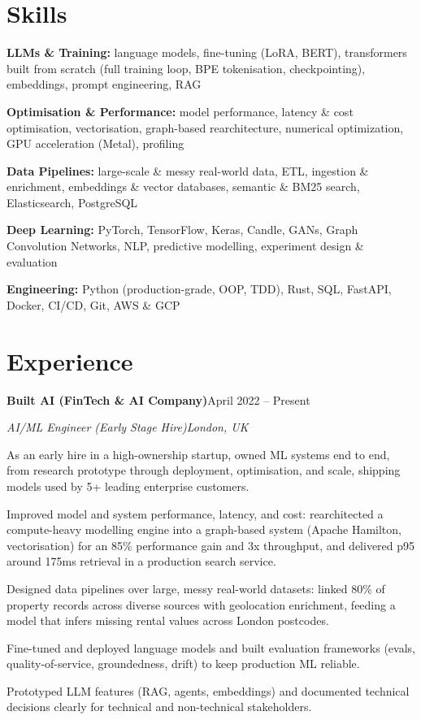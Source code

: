 \documentclass[10pt,a4paper]{article}
\newcommand{\entry}[4]{%
  {\color{company}\bfseries #1}\hfill {\color{muted}#2}\par
  \vspace{1pt}
  {\itshape #3}\hfill {\color{muted}\itshape #4}\par
  \vspace{3pt}%
}
\begin{document}
\section{Skills}
\begin{tight}
  \item[\textcolor{accent}{\small$\bullet$}] \textbf{LLMs \& Training:} language models, fine-tuning (LoRA, BERT), transformers built from scratch (full training loop, BPE tokenisation, checkpointing), embeddings, prompt engineering, RAG
  \item[\textcolor{accent}{\small$\bullet$}] \textbf{Optimisation \& Performance:} model performance, latency \& cost optimisation, vectorisation, graph-based rearchitecture, numerical optimization, GPU acceleration (Metal), profiling
  \item[\textcolor{accent}{\small$\bullet$}] \textbf{Data Pipelines:} large-scale \& messy real-world data, ETL, ingestion \& enrichment, embeddings \& vector databases, semantic \& BM25 search, Elasticsearch, PostgreSQL
  \item[\textcolor{accent}{\small$\bullet$}] \textbf{Deep Learning:} PyTorch, TensorFlow, Keras, Candle, GANs, Graph Convolution Networks, NLP, predictive modelling, experiment design \& evaluation
  \item[\textcolor{accent}{\small$\bullet$}] \textbf{Engineering:} Python (production-grade, OOP, TDD), Rust, SQL, FastAPI, Docker, CI/CD, Git, AWS \& GCP
\end{tight}

\section{Experience}
\entry{Built AI (FinTech \& AI Company)}{April 2022 -- Present}{AI/ML Engineer (Early Stage Hire)}{London, UK}
\begin{tight}
  \item As an early hire in a high-ownership startup, owned ML systems end to end, from research prototype through deployment, optimisation, and scale, shipping models used by 5+ leading enterprise customers.
  \item Improved model and system performance, latency, and cost: rearchitected a compute-heavy modelling engine into a graph-based system (Apache Hamilton, vectorisation) for an 85\% performance gain and 3x throughput, and delivered p95 around 175ms retrieval in a production search service.
  \item Designed data pipelines over large, messy real-world datasets: linked 80\% of property records across diverse sources with geolocation enrichment, feeding a model that infers missing rental values across London postcodes.
  \item Fine-tuned and deployed language models and built evaluation frameworks (evals, quality-of-service, groundedness, drift) to keep production ML reliable.
  \item Prototyped LLM features (RAG, agents, embeddings) and documented technical decisions clearly for technical and non-technical stakeholders.
\end{tight}
\end{document}
